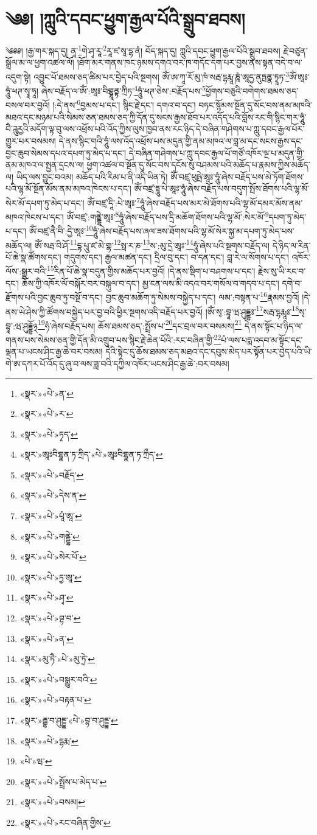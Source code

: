 \chapter{༄༅། །ཀླུའི་དབང་ཕྱུག་རྒྱལ་པོའི་སྒྲུབ་ཐབས།}༄༅༅། །རྒྱ་གར་སྐད་དུ། ནཱ་\footnote{«སྣར་»«པེ་»ན་}གེ་ཤྭ་རཱ་\footnote{«སྣར་»«པེ་»ར་}རཱ་ཛ་སཱ་དྷ་ནཾ། བོད་སྐད་དུ། ཀླུའི་དབང་ཕྱུག་རྒྱལ་པོའི་སྒྲུབ་ཐབས། རྗེ་བཙུན་སྒྲོལ་མ་ལ་ཕྱག་འཚལ་ལོ། །ཐོག་མར་གནས་ཁང་ཉམས་དགའ་བར་ཁ་གདོང་དག་པར་བྱས་ནས་སྟན་བདེ་བ་ལ་འདུག་སྟེ། འབྱུང་པོ་ཐམས་ཅད་ཚིམ་པར་བྱེད་པའི་སྔགས། ཨོཾ་ཨ་ཀཱ་རོ་མུ་ཁཾ་སརྦ་དྷརྨཱ་ཎཱཾ་ཨཱདྱ་ནུཏྤནྣ་ཏྭཱཏ་\footnote{«སྣར་»«པེ་»ཏྭད་}ཨོཾ་ཨཱཿ་ཧཱུཾ་ཕཊ་སྭཱ་ཧཱ། ཞེས་བརྗོད་ལ་ཨོཾ་:ཨཱཿ་བིགྷྣཱནྟ་ཀྲིཏ་\footnote{«སྣར་»ཨཱཿབིགྷྣན་ཏ་ཀྲིད་«པེ་»ཨཱཿབིགྷྣན་ཏ་ཀྲྀད་}ཧཱུཾ་ཕཊ་ཅེས་:བརྗོད་པས་\footnote{«སྣར་»«པེ་»བརྗོད་}ཕྱོགས་བཅུའི་བགེགས་ཐམས་ཅད་བསལ་བར་བྱའོ། །:དེ་ནས་\footnote{«སྣར་»«པེ་»དེས་ན་}བྱམས་པ་དང་། སྙིང་རྗེ་དང་། དགའ་བ་དང་། བཏང་སྙོམས་སྔོན་དུ་སོང་བས་ནམ་མཁའི་མཐའ་དང་མཉམ་པའི་སེམས་ཅན་ཐམས་ཅད་ཀྱི་དོན་དུ་སངས་རྒྱས་ཐོབ་པར་འདོད་པའི་བློས་རང་གི་སྙིང་གར་ཧཱུཾ་བཻ་ཌཱུརྱའི་མདོག་ལྟ་བུ་ལས་འཕྲོས་པའི་འོད་ཀྱིས་ལུས་ཁྱབ་ནས་རང་ཉིད་དེ་བཞིན་གཤེགས་པ་ཀླུ་དབང་རྒྱལ་པོར་གྱུར་པར་བསམས། དེ་ནས་སྙིང་གའི་ཧཱུཾ་ལས་འོད་འཕྲོས་པས་མདུན་གྱི་ནམ་མཁའ་ལ་བླ་མ་དང་སངས་རྒྱས་དང་བྱང་ཆུབ་སེམས་དཔའ་དཔག་ཏུ་མེད་པ་དང་། དེ་བཞིན་གཤེགས་པ་ཀླུ་དབང་རྒྱལ་པོ་གཙོ་འཁོར་ལྔ་པ་མདུན་གྱི་ནམ་མཁའ་ལ་སྤྱན་དྲངས་ལ། ཕྱག་འཚལ་བ་སྔོན་དུ་སོང་བས་དངོས་སུ་བཤམས་པའི་མཆོད་པ་རྣམས་ཀྱིས་མཆོད་ལ། ཡིད་ལས་བྱུང་བའམ། མཆོད་པའི་རིམ་པ་ནི་འདི་ཡིན་ཏེ། ཨོཾ་བཛྲ་ཕུཥྤེ་ཨཱཿ་ཧཱུཾ་ཞེས་བརྗོད་པས་མེ་ཏོག་ཐོགས་པའི་ལྷ་མོ་སྔོན་མོས་ནམ་མཁའ་ཁེངས་པ་དང་། ཨོཾ་བཛྲ་དྷཱུ་པེ་ཨཱཿ་ཧཱུཾ་ཞེས་བརྗོད་པས་བདུག་སྤོས་ཐོགས་པའི་ལྷ་མོ་སེར་མོ་དཔག་ཏུ་མེད་པ་དང་། ཨོཾ་བཛྲ་དཱི་:པེ་ཨཱཿ་\footnote{«སྣར་»«པེ་»པཱཾ་ཨཱ་}ཧཱུཾ་ཞེས་བརྗོད་པས་མར་མེ་ཐོགས་པའི་ལྷ་མོ་དམར་མོས་ནམ་མཁའ་ཁེངས་པ་དང་། ཨོཾ་བཛྲ་:གནྡྷེ་ཨཱཿ་\footnote{«སྣར་»«པེ་»གནྡྷེ་}ཧཱུཾ་ཞེས་བརྗོད་པས་དྲི་མཆོག་ཐོགས་པའི་ལྷ་མོ་:སེར་མོ་\footnote{«སྣར་»«པེ་»སེར་པོ་}དཔག་ཏུ་མེད་པ་དང་། ཨོཾ་བཛྲ་ནཻ་བི་:དྱེ་ཨཱཿ་\footnote{«སྣར་»«པེ་»ཏྱ་ཨཱ་}ཧཱུཾ་ཞེས་བརྗོད་པས་ཞལ་ཟས་ཐོགས་པའི་ལྷ་མོ་སེར་སྐྱ་མ་དཔག་ཏུ་མེད་པས་མཆོད་ལ། ཨོཾ་སརྦ་བི་ཤོ་\footnote{«སྣར་»«པེ་»ཤྭ་}དྷ་པཱུ་ཛ་མེ་གྷ་\footnote{«སྣར་»«པེ་»བྷ་བ་}སྥ་ར་ཎ་\footnote{«སྣར་»«པེ་»ན་}ས་:མུ་དྲེ་ཨཱཿ་\footnote{«སྣར་»མུ་ཏཻ་«པེ་»མུ་ཏྲེ་}ཧཱུཾ་ཞེས་པའི་སྔགས་བརྗོད་ལ། དེ་ཉིད་ལ་རིན་པོ་ཆེ་སྣ་ཚོགས་དང་། གདུགས་དང་། རྒྱལ་མཚན་དང་། དྲིལ་བུ་དང་། བ་དན་དང་། བླ་རེ་ལ་སོགས་པ་དང་། འཁོར་ལོས་:སྒྱུར་བའི་\footnote{«སྣར་»«པེ་»བསྒྱུར་བའི་}རིན་པོ་ཆེ་སྣ་བདུན་གྱིས་མཆོད་པར་བྱའོ། །དེ་ནས་སྡིག་པ་བཤགས་པ་དང་། རྗེས་སུ་ཡི་རང་བ་དང་། ཆོས་ཀྱི་འཁོར་ལོ་བསྐོར་བར་བསྐུལ་བ་དང་། མྱ་ངན་ལས་མི་འདའ་བར་གསོལ་བ་གདབ་པ་དང་། དགེ་བ་རྫོགས་པའི་བྱང་ཆུབ་ཏུ་བསྔོ་བ་དང་། བྱང་ཆུབ་མཆོག་ཏུ་སེམས་བསྐྱེད་པ་དང་། ལམ་:བསྟན་པ་\footnote{«སྣར་»«པེ་»བརྟན་པ་}རྣམས་བྱའོ། །དེ་ནས་ཡེ་ཤེས་ཀྱི་ཚོགས་བསྐྱེད་པར་བྱ་བའི་ཕྱིར་སྔགས་འདི་བརྗོད་པར་བྱའོ། །ཨོཾ་སྭ་:བྷཱ་ཝ་ཤུདྡྷཿ་\footnote{«སྣར་»རྦྷ་བ་ཤུདྡྷ་«པེ་»བྷ་བ་ཤུདྡྷ་}སརྦ་དྷརྨཱཿ་\footnote{«སྣར་»«པེ་»དྷརྨ་}སྭ་བྷཱ་:ཝ་ཤུདྡྷོ྅\footnote{«པེ་»ཝ་}ཧཾ་ཞེས་བརྗོད་པས། ཆོས་ཐམས་ཅད་:སྤྲོས་པ་\footnote{«སྣར་»«པེ་»སྤྲོས་པ་མེད་པ་}དང་བྲལ་བར་བསམས།\footnote{«སྣར་»«པེ་»བསམ།} དེ་ནས་སྟོང་པ་ཉིད་ལ་གནས་པས་སེམས་ཅན་གྱི་དོན་མི་འགྲུབ་པས་སྙིང་རྗེ་ཆེན་པོའི་:རང་བཞིན་གྱི་\footnote{«སྣར་»«པེ་»རང་བཞིན་གྱིས་}པཾ་ལས་པདྨ་འདབ་མ་སྟོང་དང་ལྡན་པ་ཡངས་ཤིང་རྒྱ་ཆེ་བར་བསམ། དེའི་སྟེང་དུ་ཆོས་ཐམས་ཅད་མཐའ་དང་དབུས་མེད་པར་སྟོན་པར་བྱེད་པའི་ཡི་གེ་ཨ་དཀར་པོ་འོད་དུ་ཞུ་བ་ལས་ཟླ་བའི་དཀྱིལ་འཁོར་ཡངས་ཤིང་རྒྱ་ཆེ་:བར་བསམ། 